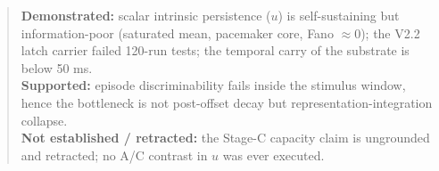 \begin{quote}
\textbf{Demonstrated:} scalar intrinsic persistence (\(u\)) is
self-sustaining but information-poor (saturated mean, pacemaker core,
Fano \(\approx 0\)); the V2.2 latch carrier failed 120-run tests; the
temporal carry of the substrate is below 50 ms.\\[1pt]
\textbf{Supported:} episode discriminability fails inside the stimulus
window, hence the bottleneck is not post-offset decay but
representation-integration collapse.\\[1pt]
\textbf{Not established / retracted:} the Stage-C capacity claim is
ungrounded and retracted; no A/C contrast in \(u\) was ever executed.
\end{quote}